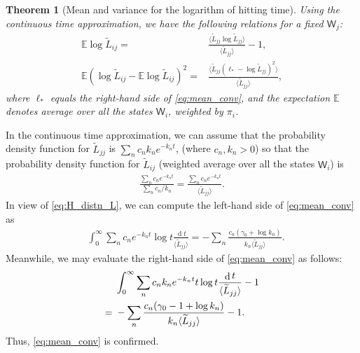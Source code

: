 \documentclass[10pt,journal,compsoc]{IEEEtran}
\newtheorem{theorem}{Theorem}
\DeclareMathOperator{\D}{d}
\begin{document}
\begin{theorem}[Mean and variance for the logarithm of hitting time]\label{thm:mean_var}Using the continuous time approximation, we have the following relations for a fixed $\mathsf W_j$:\begin{align}\mathbb E \log\widetilde L_{ij}={}&\frac{\langle\widetilde L_{jj}\log \widetilde L_{jj}\rangle}{\langle\widetilde L_{jj}\rangle}-1,\label{eq:mean_conv}\\\mathbb E (\log\widetilde L_{ij}-\mathbb E \log\widetilde L_{ij})^{2}={}&\frac{\langle\widetilde L_{jj}(\ell_*-\log \widetilde L_{jj})^{2}\rangle}{\langle\widetilde L_{jj}\rangle},\label{eq:var_conv}\end{align}where $\ell_*$ equals the right-hand side of \eqref{eq:mean_conv}, and the expectation $ \mathbb E$ denotes  average over all the states $\mathsf W_i $, weighted by $ \pi_i$.\end{theorem}\begin{IEEEproof}In the continuous time approximation, we can assume that  the probability density function for  $ \widetilde L_{jj}$ is  $\sum_nc_nk_{n}e^{-k_nt} $, (where $ c_n,k_n>0$) so that the probability density function for $ \widetilde L_{ij}$ (weighted average over all the states $\mathsf W_i $) is\begin{align}
\frac{ \displaystyle\sum_nc_ne^{-k_nt} }{\displaystyle\sum_nc_n/k_{n} }=\frac{\displaystyle\sum_nc_ne^{-k_nt} }{\langle\widetilde L_{jj}\rangle}.\label{eq:H_distn_L}
\end{align} In view of \eqref{eq:H_distn_L}, we can compute the left-hand side of \eqref{eq:mean_conv} as\begin{align}&
\int_0^\infty\sum_nc_ne^{-k_nt}\log t\frac{\D t}{\langle\widetilde L_{jj}\rangle}=-\sum_n\frac{c_n(\gamma_0+\log k_n)}{k_{n}\langle\widetilde L_{jj}\rangle}.\end{align}
Meanwhile, we  may evaluate the right-hand side of \eqref{eq:mean_conv} as follows:\begin{align}&
\int_0^\infty\displaystyle\sum_nc_nk_{n}e^{-k_nt}t\log t\frac{\D t}{\langle\widetilde L_{jj}\rangle}-1\notag\\={}&-\displaystyle\sum_n\frac{c_n(\gamma_0-1+\log k_n)}{k_{n}\langle\widetilde L_{jj}\rangle}-1.
\end{align} Thus,  \eqref{eq:mean_conv} is confirmed.


\end{IEEEproof}
\end{document}

